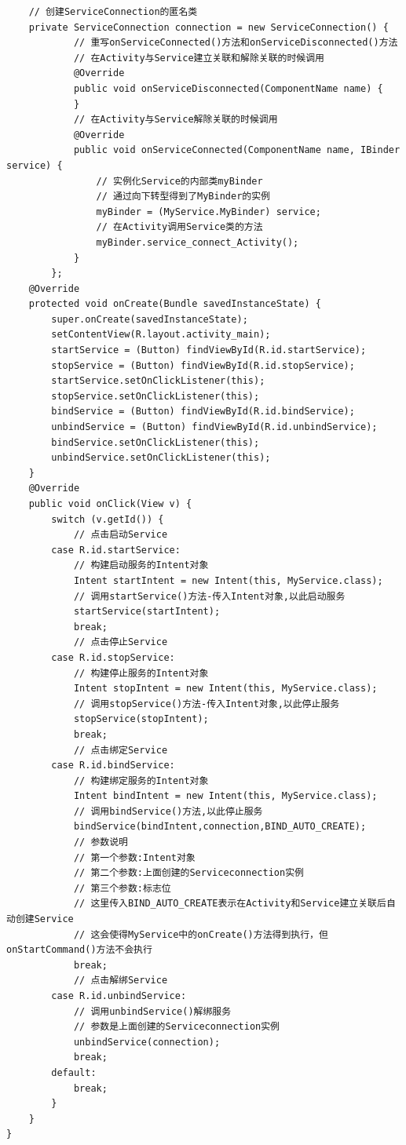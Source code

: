 \documentclass[9pt, b5paper]{article}
\begin{document}
\begin{enumerate}
\begin{itemize}
\begin{verbatim}
    // 创建ServiceConnection的匿名类
    private ServiceConnection connection = new ServiceConnection() {
            // 重写onServiceConnected()方法和onServiceDisconnected()方法
            // 在Activity与Service建立关联和解除关联的时候调用
            @Override
            public void onServiceDisconnected(ComponentName name) {
            }
            // 在Activity与Service解除关联的时候调用
            @Override
            public void onServiceConnected(ComponentName name, IBinder service) {
                // 实例化Service的内部类myBinder
                // 通过向下转型得到了MyBinder的实例
                myBinder = (MyService.MyBinder) service;
                // 在Activity调用Service类的方法
                myBinder.service_connect_Activity();
            }
        };
    @Override
    protected void onCreate(Bundle savedInstanceState) {
        super.onCreate(savedInstanceState);
        setContentView(R.layout.activity_main);
        startService = (Button) findViewById(R.id.startService);
        stopService = (Button) findViewById(R.id.stopService);
        startService.setOnClickListener(this);
        stopService.setOnClickListener(this);
        bindService = (Button) findViewById(R.id.bindService);
        unbindService = (Button) findViewById(R.id.unbindService);
        bindService.setOnClickListener(this);
        unbindService.setOnClickListener(this);
    }
    @Override
    public void onClick(View v) {
        switch (v.getId()) {
            // 点击启动Service
        case R.id.startService:
            // 构建启动服务的Intent对象
            Intent startIntent = new Intent(this, MyService.class);
            // 调用startService()方法-传入Intent对象,以此启动服务
            startService(startIntent);
            break;
            // 点击停止Service
        case R.id.stopService:
            // 构建停止服务的Intent对象
            Intent stopIntent = new Intent(this, MyService.class);
            // 调用stopService()方法-传入Intent对象,以此停止服务
            stopService(stopIntent);
            break;
            // 点击绑定Service
        case R.id.bindService:
            // 构建绑定服务的Intent对象
            Intent bindIntent = new Intent(this, MyService.class);
            // 调用bindService()方法,以此停止服务
            bindService(bindIntent,connection,BIND_AUTO_CREATE);
            // 参数说明
            // 第一个参数:Intent对象
            // 第二个参数:上面创建的Serviceconnection实例
            // 第三个参数:标志位
            // 这里传入BIND_AUTO_CREATE表示在Activity和Service建立关联后自动创建Service
            // 这会使得MyService中的onCreate()方法得到执行，但onStartCommand()方法不会执行
            break;
            // 点击解绑Service
        case R.id.unbindService:
            // 调用unbindService()解绑服务
            // 参数是上面创建的Serviceconnection实例
            unbindService(connection);
            break;
        default:
            break;
        }
    }
}
\end{verbatim}
\end{itemize}


\end{enumerate}
\end{document}
